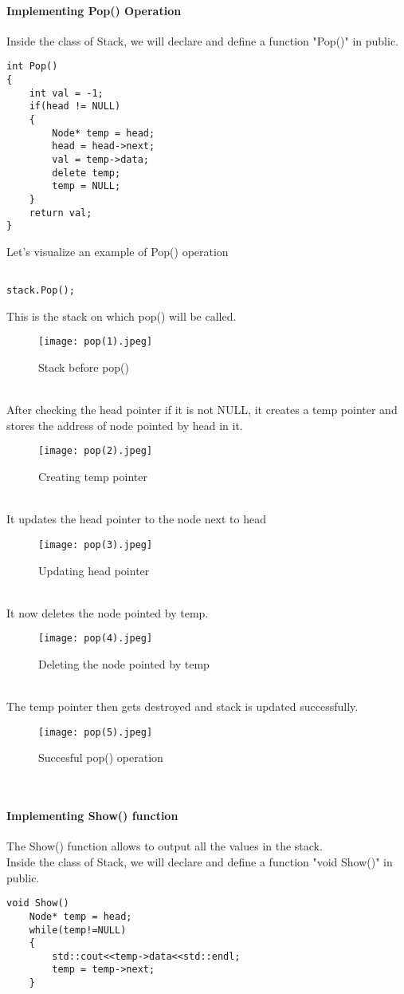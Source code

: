 \documentclass[11pt,fleqn]{book} %
\begin{document}
\paragraph{Implementing Pop() Operation}
Inside the class of Stack, we will declare and define a function "Pop()" in public.
\begin{lstlisting}
int Pop()
{
	int val = -1;
	if(head != NULL)
	{
		Node* temp = head;
		head = head->next;
		val = temp->data;
		delete temp;
		temp = NULL;
	}
	return val;
}
\end{lstlisting}
Let's visualize an example of Pop() operation
\begin{example}
\begin{lstlisting}
	
stack.Pop();
\end{lstlisting}
This is the stack on which pop() will be called.
\begin{figure}[H]
	\centering
	\texttt{[image: pop(1).jpeg]}
	\caption{Stack before pop()}
\end{figure} ~\\
After checking the head pointer if it is not NULL, it creates a temp pointer and stores the address of node pointed by head in it.
\begin{figure}[H]
	\centering
	\texttt{[image: pop(2).jpeg]}
	\caption{Creating temp pointer}
\end{figure} ~\\
It updates the head pointer to the node next to head
\begin{figure}[H]
	\centering
	\texttt{[image: pop(3).jpeg]}
	\caption{Updating head pointer}
\end{figure} ~\\
It now deletes the node pointed by temp.
\begin{figure}[H]
	\centering
	\texttt{[image: pop(4).jpeg]}
	\caption{Deleting the node pointed by temp}
\end{figure} ~\\
The temp pointer then gets destroyed and stack is updated successfully.
\begin{figure}[H]
	\centering
	\texttt{[image: pop(5).jpeg]}
	\caption{Succesful pop() operation}
\end{figure}
\end{example} ~\\
\paragraph{Implementing Show() function}
The Show()  function allows to output all the values in the stack. \\
Inside the class of Stack, we will declare and define a function "void Show()" in public.
\begin{lstlisting}
void Show()
	Node* temp = head;
	while(temp!=NULL)
	{
		std::cout<<temp->data<<std::endl;
		temp = temp->next;
	}
\end{lstlisting}
\end{document}
